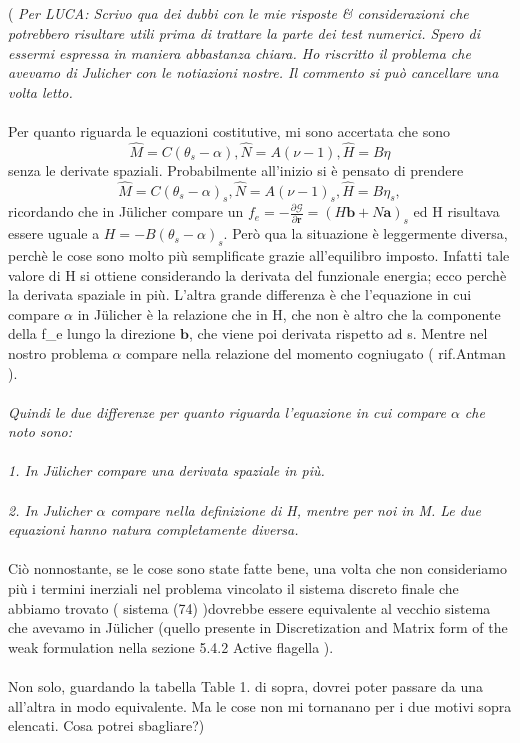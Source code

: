 \\\\\\\\
( \emph{Per LUCA: Scrivo qua dei dubbi con le mie risposte & considerazioni che potrebbero risultare utili prima di trattare la parte dei test numerici. Spero di essermi espressa in maniera abbastanza chiara. Ho riscritto il problema che avevamo di Julicher con le notiazioni nostre.
Il commento si può cancellare una volta letto.}
\\\\
Per quanto riguarda le equazioni costitutive, mi sono accertata che sono
\[ \hat{M} = C(\theta_s -\alpha), \hat{N} = A(\nu - 1), \hat{H} = B\eta \]
senza le derivate spaziali. Probabilmente all'inizio si è pensato di prendere 
\[ \hat{M} = C(\theta_s -\alpha)_s, \hat{N} = A(\nu - 1)_s, \hat{H} = B\eta _s, \] 
ricordando che in Jülicher compare un
$f_e = -\frac{\partial \mathcal{G}}{\partial \mathbf{r}} = (H \mathbf{b} + N \mathbf{a})_s$
ed H risultava essere uguale a $H = - B(\theta_s - \alpha)_s$. Però qua la situazione è leggermente diversa, perchè le cose sono molto più semplificate grazie all'equilibro imposto.
Infatti tale valore di H si ottiene considerando la derivata del funzionale energia; ecco perchè la derivata spaziale in più.
L'altra grande differenza è che l'equazione in cui compare $\alpha$ in Jülicher è la relazione che in H, che non è altro che la componente della f_e lungo la direzione $\mathbf{b}$, che viene poi derivata rispetto ad s. Mentre nel nostro problema $\alpha$ compare nella relazione del momento cogniugato ( rif.Antman ).
\\\\
\emph{Quindi le due differenze per quanto riguarda l'equazione in cui compare $\alpha$ che noto sono:}
\\\\
\emph{1. In Jülicher compare una derivata spaziale in più.}
\\\\
\emph{2. In Julicher $\alpha$ compare nella definizione di H, mentre per noi in M. Le due equazioni hanno natura completamente diversa.}
\\\\
Ciò nonnostante, se le cose sono state fatte bene, una volta che non consideriamo più i termini inerziali nel problema vincolato il sistema discreto finale che abbiamo trovato ( sistema (74) )dovrebbe essere equivalente al vecchio sistema che avevamo in Jülicher (quello presente in Discretization and Matrix form of the weak formulation nella sezione 5.4.2 Active flagella ).
\\\\
Non solo, guardando la tabella Table 1. di sopra, dovrei poter passare da una all'altra in modo equivalente. Ma le cose non mi tornanano per i due motivi sopra elencati. Cosa potrei sbagliare?) 




